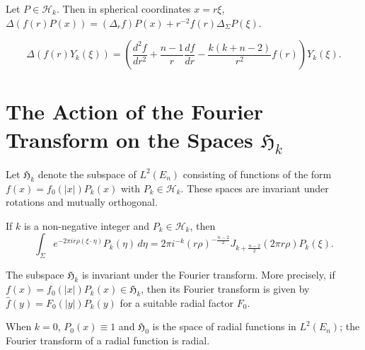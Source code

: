 \begin{lemma}\label{lem:c4-2-18}
Let $P \in \mathcal{H}_k$. Then in spherical coordinates $x = r\xi$, $\Delta(f(r) P(x)) = (\Delta_r f) P(x) + r^{-2} f(r) \Delta_\Sigma P(\xi)$.
\end{lemma}

\begin{equation}\label{eq:c4-2-19}
\Delta(f(r) Y_k(\xi)) = \left( \frac{d^2 f}{dr^2} + \frac{n-1}{r} \frac{df}{dr} - \frac{k(k + n - 2)}{r^2} f(r) \right) Y_k(\xi).
\end{equation}

\section{The Action of the Fourier Transform on the Spaces \texorpdfstring{$\mathfrak{H}_k$}{Hk}}

Let $\mathfrak{H}_k$ denote the subspace of $L^2(E_n)$ consisting of functions of the form $f(x) = f_0(|x|) P_k(x)$ with $P_k \in \mathcal{H}_k$. These spaces are invariant under rotations and mutually orthogonal.

\begin{lemma}\label{lem:c4-3-1}
If $k$ is a non-negative integer and $P_k \in \mathcal{H}_k$, then
\begin{equation}\label{eq:c4-3-2}
\int_\Sigma e^{-2\pi i r \rho (\xi \cdot \eta)} P_k(\eta)\,d\eta = 2\pi i^{-k} (r\rho)^{-\frac{n-2}{2}} J_{k + \frac{n-2}{2}}(2\pi r \rho) P_k(\xi).
\end{equation}
\end{lemma}

\begin{theorem}\label{thm:c4-3-3}
The subspace $\mathfrak{H}_k$ is invariant under the Fourier transform. More precisely, if $f(x) = f_0(|x|) P_k(x) \in \mathfrak{H}_k$, then its Fourier transform is given by $\hat{f}(y) = F_0(|y|) P_k(y)$ for a suitable radial factor $F_0$.
\end{theorem}

\begin{theorem}\label{thm:c4-3-4}
When $k = 0$, $P_0(x) \equiv 1$ and $\mathfrak{H}_0$ is the space of radial functions in $L^2(E_n)$; the Fourier transform of a radial function is radial.
\end{theorem}

